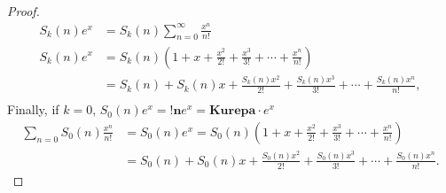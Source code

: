 \documentclass[pdflatex,sn-mathphys-num]{sn-jnl}%
\theoremstyle{thmstyleone}%
\theoremstyle{thmstyletwo}%
\theoremstyle{thmstylethree}%
\begin{document}
\begin{proof}
\begin{align*}
S_k(n)e^x &=S_k(n) \sum_{n=0}^{\infty} \frac{x^n}{n!}\\
S_k(n)e^x &= S_k(n)\left(1 + x +\frac{x^2}{2!}+ \frac{x^3}{3!}+\cdots +\frac{x^n}{n!}\right)\\
& =  S_k(n) + S_k(n)x +\frac{S_k(n)x^2}{2!}+ \frac{S_k(n)x^3}{3!}+\cdots + \frac{S_k(n)x^n}{n!},\\
\end{align*}
Finally, if $k =0$, $S_0(n)e^x = \mathbf{!n}e^x = \mathbf{Kurepa} \cdotp e^x$
\begin{align*}
\sum_{n=0} S_0(n)\frac{x^n}{n!}&=S_0(n)e^x = S_0(n)\left(1 + x +\frac{x^2}{2!}+ \frac{x^3}{3!}+\cdots  +\frac{x^n}{n!}\right)\\
& =  S_0(n) + S_0(n)x +\frac{S_0(n)x^2}{2!}+ \frac{S_0(n)x^3}{3!}+\cdots + \frac{S_0(n)x^n}{n!}.
\end{align*}
    
\end{proof}
\end{document}
